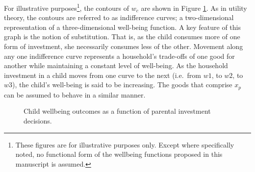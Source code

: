 \documentclass[review]{elsarticle}\usepackage[]{graphicx}\usepackage[]{color}
\begin{document}
For illustrative purposes\footnote{These figures are for illustrative
  purposes only. Except where specifically noted, no functional form of
  the wellbeing functions proposed in this manuscript is assumed.}, the
contours of $w_c$ are shown in Figure \ref{fig:fig3}. As in utility theory, the
contours are referred to as indifference curves; a two-dimensional
representation of a three-dimensional well-being function. A key feature
of this graph is the notion of substitution. That is, as the child
consumes more of one form of investment, she necessarily consumes less
of the other. Movement along any one indifference curve represents a
household's trade-offs of one good for another while maintaining a
constant level of well-being. As the household investment in a child
moves from one curve to the next (i.e.~from $w1$, to $w2$, to $w3$), the
child's well-being is said to be increasing. The goods that comprise
$x_p$ can be assumed to behave in a similar manner.

\begin{figure}[htp] 
\caption{Child wellbeing outcomes as a function of parental investment decisions.}
\label{fig:fig3}
\end{figure}  
\end{document}
